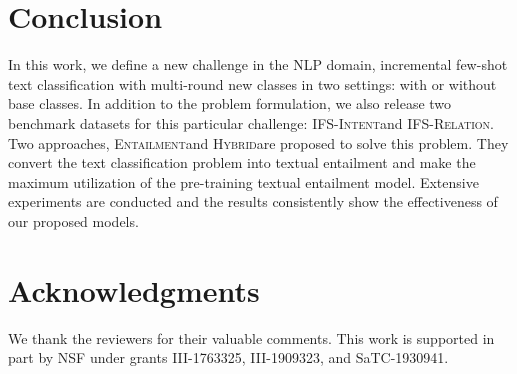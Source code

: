 \documentclass[11pt]{article}
\newcommand{\modelname}{\textsc{Entailment}}
\newcommand{\hybrid}{\textsc{Hybrid}}
\newcommand{\intentdata}{\textsc{IFS-Intent}}
\newcommand{\relationdata}{\textsc{IFS-Relation}}
\begin{document}
\section{Conclusion}
In this work, we define a new challenge in the NLP domain, incremental few-shot text classification with multi-round new classes in two settings: with or without base classes. In addition to the problem formulation, we also release two benchmark datasets for this particular challenge: \intentdata\enspace and \relationdata. Two approaches, \modelname\enspace and \hybrid\enspace are proposed to solve this problem. They convert the text classification problem into textual entailment and make the maximum utilization of the pre-training textual entailment model. Extensive experiments are conducted and the results consistently show the effectiveness of our proposed models.

\section*{Acknowledgments}
We thank the reviewers for their valuable comments.
This work is supported in part by NSF under grants III-1763325, III-1909323, and SaTC-1930941. 




\end{document}
